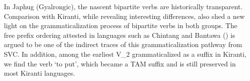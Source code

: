 \documentclass[oneside,a4paper,11pt]{article}
\begin{document}
In Japhug (Gyalrongic), the nascent bipartite verbs are historically transparent. Comparison with  Kiranti, while revealing interesting differences, also shed a new light on the grammaticalization process of bipartite verbs in both groups. The free prefix ordering attested in languages such as Chintang and Bantawa (\citealt{bickel07chintang}) is argued to be one of the indirect traces of this grammaticalization pathway from SVC. In addition, among the earliest V_2 grammaticalized as a suffix in Kiranti, we find the verb `to put', which became a TAM suffix and is still preserved in most Kiranti languages.




 
\end{document}
